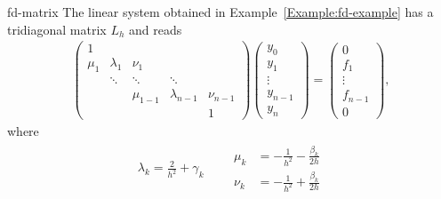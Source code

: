 \begin{Example}{fd-matrix}
  The linear system obtained in Example~\ref{Example:fd-example} has a
  tridiagonal matrix $L_h$ and reads
  \begin{gather}
    \label{eq:fd-matrix:1}
    \begin{pmatrix}
      1 \\
      \mu_1 & \lambda_1 & \nu_1 \\
      & \ddots & \ddots & \ddots \\
      &&\mu_{1-1} & \lambda_{n-1} & \nu_{n-1} \\
      &&&&1
    \end{pmatrix}
    \begin{pmatrix}
      y_0 \\y_1\\\vdots\\y_{n-1}\\y_n
    \end{pmatrix}
    =
    \begin{pmatrix}
      0 \\ f_1 \\ \vdots \\f_{n-1} \\ 0
    \end{pmatrix},
  \end{gather}
  where
  \begin{gather*}
    \lambda_k = \frac2{h^2} + \gamma_k
    \qquad
    \begin{aligned}
    \mu_k &= -\frac1{h^2} - \frac{\beta_k}{2h} \\
    \nu_k &= -\frac1{h^2} + \frac{\beta_k}{2h}      
    \end{aligned}
  \end{gather*}
\end{Example}

